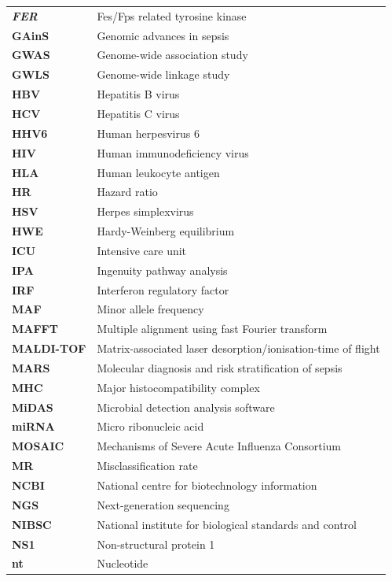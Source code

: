 \begin{longtable}[l]{l l}
		\textit{\textbf{FER}} & Fes/Fps related tyrosine kinase\\
		\textbf{GAinS} & Genomic advances in sepsis\\
		\textbf{GWAS} & Genome-wide association study\\
		\textbf{GWLS} & Genome-wide linkage study\\
		\textbf{HBV} & Hepatitis B virus\\
		\textbf{HCV} & Hepatitis C virus\\
		\textbf{HHV6} & Human herpesvirus 6\\
		\textbf{HIV} & Human immunodeficiency virus\\
		\textbf{HLA} & Human leukocyte antigen\\
		\textbf{HR} & Hazard ratio\\
		\textbf{HSV} & Herpes simplexvirus\\
		\textbf{HWE} & Hardy-Weinberg equilibrium\\
		\textbf{ICU} & Intensive care unit\\
		\textbf{IPA} & Ingenuity pathway analysis\\
		\textbf{IRF} & Interferon regulatory factor\\
		\textbf{MAF} & Minor allele frequency\\
		\textbf{MAFFT} & Multiple alignment using fast Fourier transform\\
		\textbf{MALDI-TOF} & Matrix-associated laser desorption/ionisation-time of flight\\
		\textbf{MARS} & Molecular diagnosis and risk stratification of sepsis\\
		\textbf{MHC} & Major histocompatibility complex\\
		\textbf{MiDAS} & Microbial detection analysis software\\
		\textbf{miRNA} & Micro ribonucleic acid\\
		\textbf{MOSAIC} & Mechanisms of Severe Acute Influenza Consortium\\
		\textbf{MR} & Misclassification rate\\
		\textbf{NCBI} & National centre for biotechnology information\\
		\textbf{NGS} & Next-generation sequencing\\
		\textbf{NIBSC} & National institute for biological standards and control\\
		\textbf{NS1} & Non-structural protein 1\\
		\textbf{nt} & Nucleotide\\

\end{longtable}
